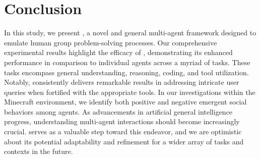 \section{Conclusion}
\label{sec:conclusion}

In this study, we present \framework, a novel and general multi-agent framework designed to emulate human group problem-solving processes. Our comprehensive experimental results highlight the efficacy of \framework, demonstrating its enhanced performance in comparison to individual agents across a myriad of tasks. These tasks encompass general understanding, reasoning, coding, and tool utilization. Notably, \framework consistently delivers remarkable results in addressing intricate user queries when fortified with the appropriate tools. In our investigations within the Minecraft environment, we identify both positive and negative emergent social behaviors among agents. As advancements in artificial general intelligence progress, understanding multi-agent interactions should become increasingly crucial. \framework serves as a valuable step toward this endeavor, and we are optimistic about its potential adaptability and refinement for a wider array of tasks and contexts in the future.